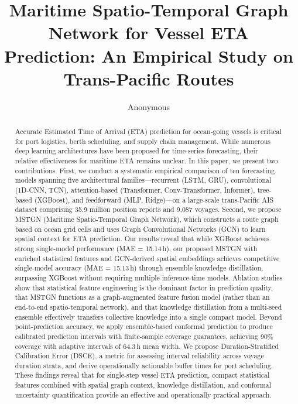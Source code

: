 \documentclass[sigconf,anonymous]{acmart}%
\begin{document}
\title{Maritime Spatio-Temporal Graph Network for Vessel ETA Prediction: An Empirical Study on Trans-Pacific Routes}

\author{Anonymous}

\renewcommand{\shortauthors}{Anonymous}

\begin{abstract}
Accurate Estimated Time of Arrival (ETA) prediction for ocean-going vessels is critical for port logistics, berth scheduling, and supply chain management.
While numerous deep learning architectures have been proposed for time-series forecasting, their relative effectiveness for maritime ETA remains unclear.
In this paper, we present two contributions.
First, we conduct a systematic empirical comparison of ten forecasting models spanning five architectural families---recurrent (LSTM, GRU), convolutional (1D-CNN, TCN), attention-based (Transformer, Conv-Transformer, Informer), tree-based (XGBoost), and feedforward (MLP, Ridge)---on a large-scale trans-Pacific AIS dataset comprising 35.9 million position reports and 9,087 voyages.
Second, we propose MSTGN (Maritime Spatio-Temporal Graph Network), which constructs a route graph based on ocean grid cells and uses Graph Convolutional Networks (GCN) to learn spatial context for ETA prediction.
Our results reveal that while XGBoost achieves strong single-model performance (MAE = 15.14\,h), our proposed MSTGN with enriched statistical features and GCN-derived spatial embeddings achieves competitive single-model accuracy (MAE = 15.13\,h) through ensemble knowledge distillation, surpassing XGBoost without requiring multiple inference-time models.
Ablation studies show that statistical feature engineering is the dominant factor in prediction quality, that MSTGN functions as a graph-augmented feature fusion model (rather than an end-to-end spatio-temporal network), and that knowledge distillation from a multi-seed ensemble effectively transfers collective knowledge into a single compact model.
Beyond point-prediction accuracy, we apply ensemble-based conformal prediction to produce calibrated prediction intervals with finite-sample coverage guarantees, achieving 90\% coverage with adaptive intervals of 64.3\,h mean width.
We propose Duration-Stratified Calibration Error (DSCE), a metric for assessing interval reliability across voyage duration strata, and derive operationally actionable buffer times for port scheduling.
These findings reveal that for single-step vessel ETA prediction, compact statistical features combined with spatial graph context, knowledge distillation, and conformal uncertainty quantification provide an effective and operationally practical approach.
\end{abstract}
\end{document}
